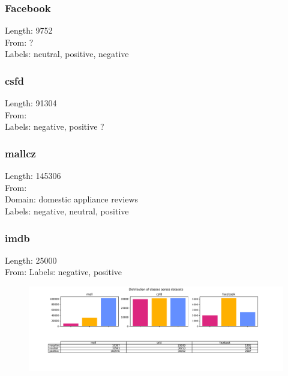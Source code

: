 \subsubsection{Facebook}
Length: 9752\\
From: ? \\
Labels: neutral, positive, negative

\subsubsection{csfd}
Length: 91304 \\
From: \\
Labels: negative, positive ? \\

\subsubsection{mallcz}
Length: 145306 \\
From: \\
Domain: domestic appliance reviews \\
Labels: negative, neutral, positive

\subsubsection{imdb}
Length: 25000 \\
From:
Labels: negative, positive



\begin{figure}[h]
\centering
\includegraphics[width=1\columnwidth]{../img/distribution}
\protect\caption{}
\label{pic:dist}
\end{figure}

